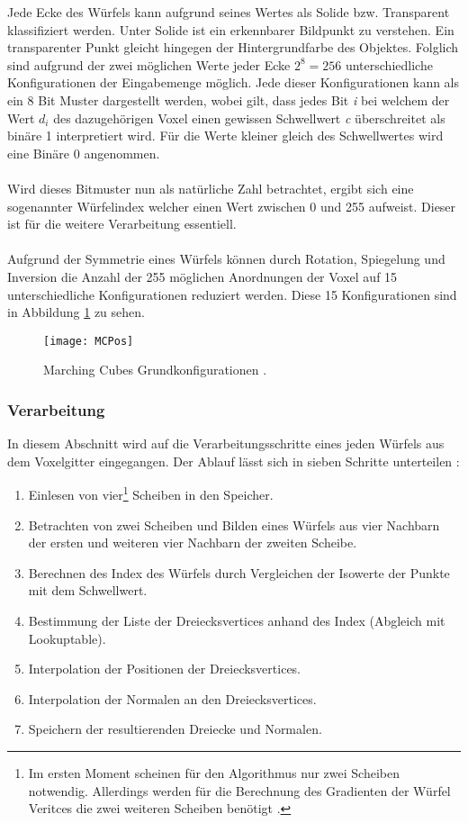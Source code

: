 \noindent Jede Ecke des Würfels kann aufgrund seines Wertes als Solide bzw. Transparent klassifiziert werden. Unter Solide ist ein erkennbarer  Bildpunkt zu verstehen. Ein transparenter Punkt gleicht hingegen der Hintergrundfarbe des Objektes. Folglich sind aufgrund der zwei möglichen Werte jeder Ecke $2^{8} = 256$ unterschiedliche Konfigurationen der Eingabemenge möglich. Jede dieser Konfigurationen kann als ein 8 Bit Muster dargestellt werden, wobei gilt, dass jedes Bit \textit{i} bei welchem der Wert \textit{$d_{i}$} des dazugehörigen Voxel einen gewissen Schwellwert \textit{c} überschreitet als binäre 1 interpretiert wird. Für die Werte kleiner gleich des Schwellwertes wird eine Binäre 0 angenommen.\\
\\ 
Wird dieses Bitmuster nun als natürliche Zahl betrachtet, ergibt sich eine sogenannter Würfelindex welcher einen Wert zwischen 0  und 255 aufweist. Dieser ist für die weitere Verarbeitung essentiell.\\
\\
Aufgrund der Symmetrie eines Würfels können durch Rotation, Spiegelung und Inversion die Anzahl der 255 möglichen Anordnungen der Voxel auf 15 unterschiedliche Konfigurationen reduziert werden. Diese 15 Konfigurationen sind in Abbildung \ref{fig:MCPos} zu sehen.

\begin{figure}[H]
	\centering
	\texttt{[image: MCPos]}
	\caption{Marching Cubes Grundkonfigurationen \citep{MCAlgo}.}
	\label{fig:MCPos}
\end{figure}

\subsubsection{Verarbeitung}
In diesem Abschnitt wird auf die Verarbeitungsschritte eines jeden Würfels aus dem Voxelgitter eingegangen. Der Ablauf lässt sich in sieben Schritte unterteilen \citep{MCAlgo}:\\
\begin{enumerate}
	\item Einlesen von vier\footnote{Im ersten Moment scheinen für den Algorithmus nur zwei Scheiben notwendig. Allerdings werden für die Berechnung des Gradienten der Würfel Veritces die zwei weiteren Scheiben benötigt \citep{MCAlgo}.} Scheiben in den Speicher.
	\item Betrachten von zwei Scheiben und Bilden eines Würfels aus vier Nachbarn der ersten und weiteren vier Nachbarn der zweiten Scheibe.
	\item Berechnen des Index des Würfels durch Vergleichen der Isowerte der Punkte mit dem Schwellwert.
	\item Bestimmung der Liste der Dreiecksvertices anhand des Index (Abgleich mit Lookuptable).
	\item Interpolation der Positionen der Dreiecksvertices.
	\item Interpolation der Normalen an den Dreiecksvertices.
	\item Speichern der resultierenden Dreiecke und Normalen.\\
\end{enumerate}

